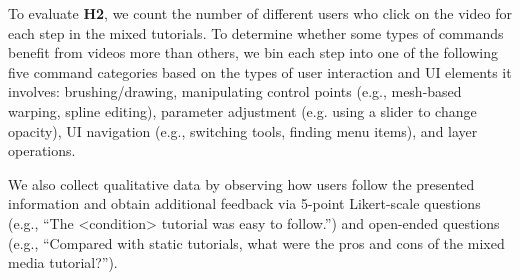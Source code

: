 To evaluate \textbf{H2}, we count the number of different users who click on the video for each step in the mixed tutorials. To determine whether some types of commands benefit from videos more than others, we bin each step into one of the following five command categories based on the types of user interaction and UI elements it involves: brushing/drawing, manipulating control points (e.g., mesh-based warping, spline editing), parameter adjustment (e.g. using a slider to change opacity), UI navigation (e.g., switching tools, finding menu items), and layer operations.

We also collect qualitative data by observing how users follow the presented information and obtain additional feedback via 5-point Likert-scale questions (e.g., ``The {\textless}condition{\textgreater} tutorial was easy to follow.'') and open-ended questions (e.g., ``Compared with static tutorials, what were the pros and cons of the mixed media tutorial?'').
